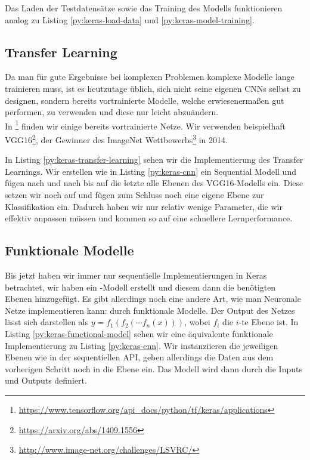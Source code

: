 
Das Laden der Testdatensätze sowie das Training des Modells funktionieren analog zu Listing \ref{py:keras-load-data} 
und \ref{py:keras-model-training}. 

\subsection{Transfer Learning}
Da man für gute Ergebnisse bei komplexen Problemen komplexe Modelle lange trainieren muss, 
ist es heutzutage üblich, sich nicht seine eigenen CNNs selbst zu designen, sondern bereits vortrainierte 
Modelle, welche erwiesenermaßen gut performen, zu verwenden und diese nur leicht abzuändern. \\
In \footnote{\url{https://www.tensorflow.org/api_docs/python/tf/keras/applications}}
finden wir einige bereits vortrainierte Netze. Wir verwenden beispielhaft VGG16\footnote{\url{https://arxiv.org/abs/1409.1556}}, 
der Gewinner des ImageNet Wettbewerbs\footnote{\url{http://www.image-net.org/challenges/LSVRC/}} in 2014. 


In Listing \ref{py:keras-transfer-learning} sehen wir die Implementierung des Transfer Learnings. 
Wir erstellen wie in Listing \ref{py:keras-cnn} ein Sequential Modell und fügen nach und nach 
bis auf die letzte alle Ebenen des VGG16-Modells ein. Diese setzen wir noch auf  
und fügen zum Schluss noch eine eigene Ebene zur Klassifikation ein. Dadurch haben wir nur relativ wenige Parameter, 
die wir effektiv anpassen müssen und kommen so auf eine schnellere Lernperformance.

\subsection{Funktionale Modelle}
Bis jetzt haben wir immer nur sequentielle Implementierungen in Keras betrachtet, wir haben ein -Modell erstellt und diesem dann 
die benötigten Ebenen hinzugefügt. Es gibt allerdings noch eine andere Art, wie man Neuronale Netze implementieren kann: durch funktionale Modelle.
Der Output des Netzes lässt sich darstellen als \(y = f_1(f_2(\cdots f_n(x)))\), wobei \(f_i\) die \(i\)-te Ebene ist. 
In Listing \ref{py:keras-functional-model} sehen wir eine äquivalente funktionale Implementierung zu Listing \ref{py:keras-cnn}. 
Wir instanziieren die jeweiligen Ebenen wie in der sequentiellen API, geben allerdings die Daten aus dem vorherigen Schritt noch in die Ebene ein. 
Das Modell wird dann durch die Inputs und Outputs definiert. 

